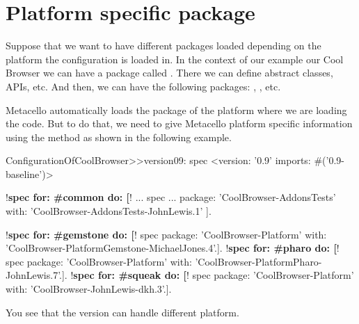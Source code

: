 \documentclass[a4paper,10pt,twoside]{book}
\begin{document}

\section {Platform specific package}

Suppose that we want to have different packages loaded depending on the platform the configuration is loaded in. In the context of our example our Cool Browser we can have a package called . There we can define abstract classes, APIs, etc. And then, we can have the following packages: , , etc.

Metacello automatically loads the package of the platform where we are loading the code. But to do that, we need to give Metacello  platform specific information using the method  as shown in the following example.

\begin{code}{} 
ConfigurationOfCoolBrowser>>version09: spec 
	<version: '0.9' imports: #('0.9-baseline')>
	
	!\textbf{spec for: \#common do: [}!
		...
		spec 
	          ...
			package: 'CoolBrowser-AddonsTests' with: 'CoolBrowser-AddonsTests-JohnLewis.1' ].
	
	!\textbf{spec for: \#gemstone do: [}!
		spec package: 'CoolBrowser-Platform' with: 'CoolBrowser-PlatformGemstone-MichaelJones.4'.].
	!\textbf{spec for: \#pharo do: [}!
		spec package: 'CoolBrowser-Platform' with: 'CoolBrowser-PlatformPharo-JohnLewis.7'.].
	!\textbf{spec for: \#squeak do: [}!
		spec package: 'CoolBrowser-Platform' with: 'CoolBrowser-JohnLewis-dkh.3'.].
\end{code}

You see that the version can handle different platform.
\end{document}
